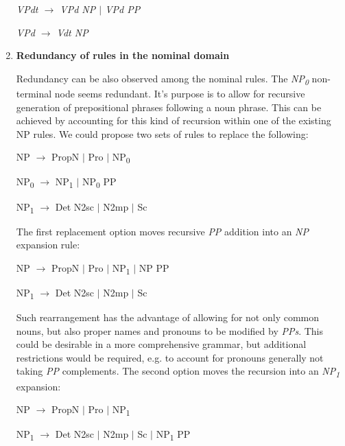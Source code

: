 \documentclass{article}
\begin{document}
\begin{enumerate}
\begin{center}
			\emph{VPdt $\rightarrow$ VPd NP $\vert$ VPd PP}
			
			\emph{VPd $\rightarrow$ Vdt NP}
			
		\end{center}
		
		
		\item
		\textbf{Redundancy of rules in the nominal domain}
		
		Redundancy can be also observed among the nominal rules. The \emph{NP\textsubscript{0}} non-terminal node seems redundant. It's purpose is to allow for recursive generation of prepositional phrases following a noun phrase. This can be achieved by accounting for this kind of recursion within one of the existing NP rules. We could propose two sets of rules to replace the following:
		\begin{center}
			NP $\rightarrow$ PropN $\vert$  Pro $\vert$  NP\textsubscript{0}
			
			NP\textsubscript{0} $\rightarrow$ NP\textsubscript{1} $\vert$  NP\textsubscript{0} PP
			
			NP\textsubscript{1} $\rightarrow$ Det N2sc $\vert$  N2mp $\vert$  Sc
			
		\end{center}
		The first replacement option moves recursive \emph{PP} addition into an \emph{NP} expansion rule:
		\begin{center}
			
			NP $\rightarrow$ PropN $\vert$ Pro $\vert$ NP\textsubscript{1} $\vert$ NP PP
			
			NP\textsubscript{1} $\rightarrow$ Det N2sc $\vert$  N2mp $\vert$  Sc
			
		\end{center}
		Such rearrangement has the advantage of allowing for not only common nouns, but also proper names and pronouns to be modified by \emph{PPs}. This could be desirable in a more comprehensive grammar, but additional restrictions would be required, e.g. to account for pronouns generally not taking \emph{PP} complements.
		The second option moves the recursion into an \emph{NP\textsubscript{1}} expansion:
		\begin{center}
			
			NP $\rightarrow$ PropN $\vert$  Pro $\vert$  NP\textsubscript{1}
			
			NP\textsubscript{1} $\rightarrow$ Det N2sc $\vert$ N2mp $\vert$ Sc $\vert$ NP\textsubscript{1} PP
			
			
		\end{center}
		

\end{enumerate}
\end{document}
